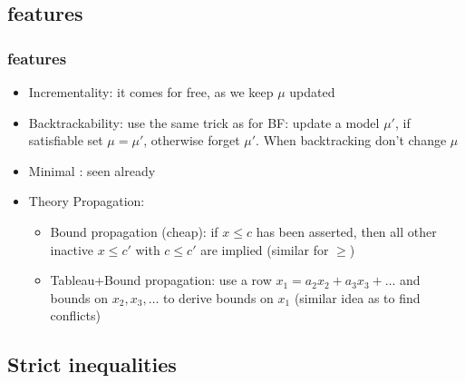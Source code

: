 \subsection{\tsolver features}

\begin{frame}
  \frametitle{\tsolver features}

\begin{itemize}

\item Incrementality: it comes for free, as we keep $\mu$ updated

\vfill\pause

\item Backtrackability: use the same trick as for BF: update
      a model $\mu'$, if satisfiable set $\mu = \mu'$, otherwise
      forget $\mu'$. When backtracking don't change $\mu$

\vfill\pause

\item Minimal \tconflicts: seen already

\vfill\pause

\item Theory Propagation:

  \begin{itemize}

    \item Bound propagation (cheap): if $x \leq c$ has been
	  asserted, then all other inactive $x \leq c'$ with
	  $c \leq c'$ are implied (similar for $\geq$)

\vfill\pause

    \item Tableau+Bound propagation: use a row
          $x_1 = a_2 x_2 + a_3 x_3 + \ldots$
	  and bounds on $x_2, x_3, \ldots$ to
	  derive bounds on $x_1$ (similar idea as to find conflicts)

  \end{itemize}

\end{itemize}

\end{frame}

\subsection{Strict inequalities}

